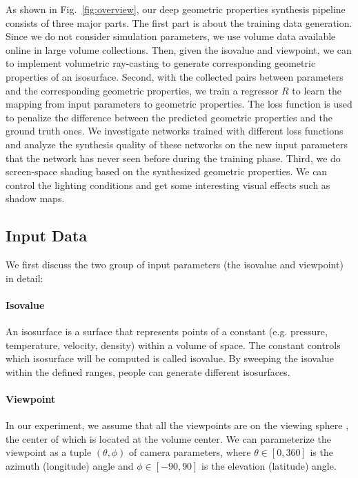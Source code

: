 \documentclass[journal]{vgtc}                %
\begin{document}
As shown in Fig.~\ref{fig:overview}, our deep geometric properties synthesis pipeline consists of three major parts. The first part is about the training data generation. Since we do not consider simulation parameters, we use volume data available online in large volume collections. Then, given the isovalue and viewpoint, we can to implement volumetric ray-casting to generate corresponding geometric properties of an isosurface. Second, with the collected pairs between parameters and the corresponding geometric properties, we train a regressor $R$ to learn the mapping from input parameters to geometric properties. The loss function is used to penalize the difference between the predicted geometric properties and the ground truth ones. We investigate networks trained with different loss functions and analyze the synthesis quality of these networks on the new input parameters that the network has never seen before during the training phase. Third, we do screen-space shading based on the synthesized geometric properties. We can control the lighting conditions and get some interesting visual effects such as shadow maps.

\subsection{Input Data}
We first discuss the two group of input parameters (the isovalue and viewpoint) in detail:

\paragraph{Isovalue}
An isosurface is a surface that represents points of a constant (e.g. pressure, temperature, velocity, density) within a volume of space. The constant controls which isosurface will be computed is called isovalue. By sweeping the isovalue within the defined ranges, people can generate different isosurfaces. 

\paragraph{Viewpoint}
In our experiment, we assume that all the viewpoints are on the viewing sphere \cite{Ji2006DVS}, the center of which is located at the volume center. We can parameterize the viewpoint as a tuple $(\theta, \phi)$ of camera parameters, where $\theta \in [0, 360]$ is the azimuth (longitude) angle and $\phi \in [-90,90]$ is the elevation (latitude) angle. 
\end{document}
